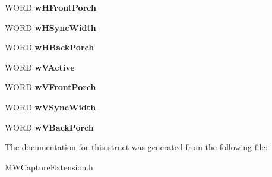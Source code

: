 \begin{DoxyCompactItemize}
\item 
\hypertarget{struct__MWCAP__VIDEO__TIMING_a1eb403462abc5e2b503f4502dddbbb6d}{W\-O\-R\-D {\bfseries w\-H\-Front\-Porch}}\label{struct__MWCAP__VIDEO__TIMING_a1eb403462abc5e2b503f4502dddbbb6d}

\item 
\hypertarget{struct__MWCAP__VIDEO__TIMING_ae7b023d100532c04ccab89011530c8aa}{W\-O\-R\-D {\bfseries w\-H\-Sync\-Width}}\label{struct__MWCAP__VIDEO__TIMING_ae7b023d100532c04ccab89011530c8aa}

\item 
\hypertarget{struct__MWCAP__VIDEO__TIMING_a4f919355fbd1b4791826cf4bf00ed20b}{W\-O\-R\-D {\bfseries w\-H\-Back\-Porch}}\label{struct__MWCAP__VIDEO__TIMING_a4f919355fbd1b4791826cf4bf00ed20b}

\item 
\hypertarget{struct__MWCAP__VIDEO__TIMING_a58951d42c1aac9ed000c446874ec375b}{W\-O\-R\-D {\bfseries w\-V\-Active}}\label{struct__MWCAP__VIDEO__TIMING_a58951d42c1aac9ed000c446874ec375b}

\item 
\hypertarget{struct__MWCAP__VIDEO__TIMING_a351df58423ff14d46e067f3cce8b1b1f}{W\-O\-R\-D {\bfseries w\-V\-Front\-Porch}}\label{struct__MWCAP__VIDEO__TIMING_a351df58423ff14d46e067f3cce8b1b1f}

\item 
\hypertarget{struct__MWCAP__VIDEO__TIMING_ad9b87f84c1d011b017d2d3cf0bbc0a1d}{W\-O\-R\-D {\bfseries w\-V\-Sync\-Width}}\label{struct__MWCAP__VIDEO__TIMING_ad9b87f84c1d011b017d2d3cf0bbc0a1d}

\item 
\hypertarget{struct__MWCAP__VIDEO__TIMING_a45df994a92cd7e63a50165ce67651474}{W\-O\-R\-D {\bfseries w\-V\-Back\-Porch}}\label{struct__MWCAP__VIDEO__TIMING_a45df994a92cd7e63a50165ce67651474}

\end{DoxyCompactItemize}


The documentation for this struct was generated from the following file\-:\begin{DoxyCompactItemize}
\item 
M\-W\-Capture\-Extension.\-h\end{DoxyCompactItemize}
